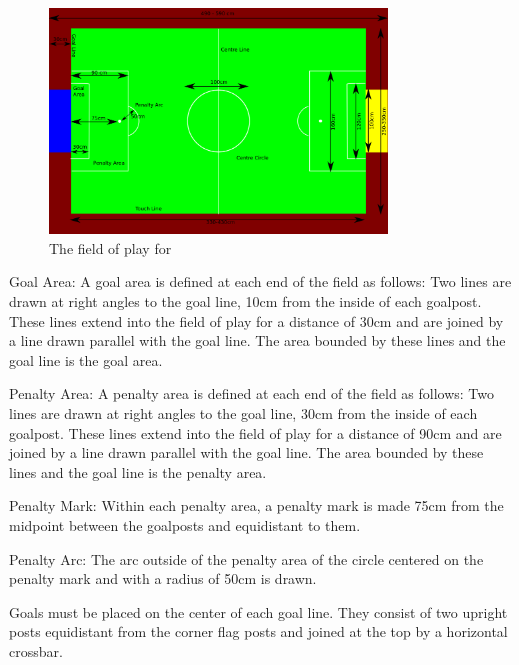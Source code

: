 \documentclass[12pt]{hurocup}
\begin{document}
\begin{lawlist}
  \begin{figure}
    \begin{center}
      \includegraphics[width=0.8\textwidth]{Figures/hurocup-field}
      \caption{The field of play for \HuroCup}
      \label{fig:field-hurocup}
    \end{center}
  \end{figure}
  
\item Goal Area: A goal area is defined at each end of the field as
  follows: Two lines are drawn at right angles to the goal line, 10cm
  from the inside of each goalpost. These lines extend into the field
  of play for a distance of 30cm and are joined by a line drawn
  parallel with the goal line. The area bounded by these lines and the
  goal line is the goal area.
  
\item Penalty Area: A penalty area is defined at each end of the field
  as follows: Two lines are drawn at right angles to the goal line,
  30cm from the inside of each goalpost. These lines extend into the
  field of play for a distance of 90cm and are joined by a line drawn
  parallel with the goal line. The area bounded by these lines and the
  goal line is the penalty area.
  
\item \label{penalty-mark} Penalty Mark: Within each penalty area, a
  penalty mark is made 75cm from the midpoint between the goalposts
  and equidistant to them.
  
\item \label{penalty-arc} Penalty Arc: The arc outside of the penalty
  area of the circle centered on the penalty mark and with a radius of
  50cm is drawn.

\item Goals must be placed on the center of each goal line. They
  consist of two upright posts equidistant from the corner flag posts
  and joined at the top by a horizontal crossbar.
  

\end{lawlist}
\end{document}

